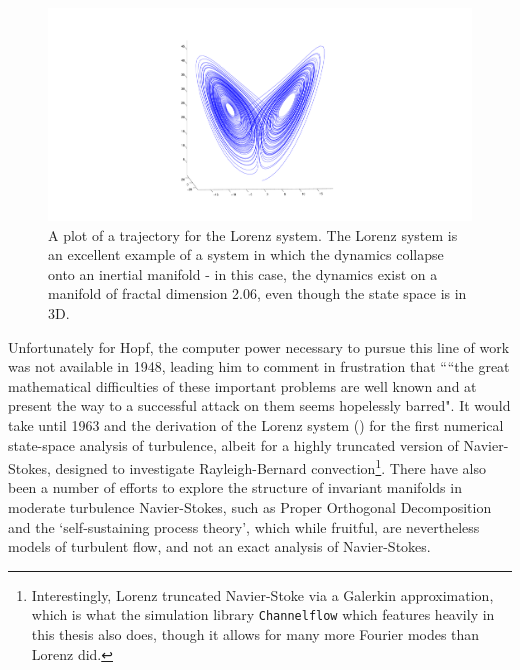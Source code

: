 \begin{figure}[h]
\centerline{
\includegraphics[scale=0.5	]{Figs/LorenzAttractor}}
\caption{A plot of a trajectory for the Lorenz system. The Lorenz system is an excellent example of a system in which the dynamics collapse onto an inertial manifold - in this case, the dynamics exist on a manifold of fractal dimension 2.06, even though the state space is in 3D. }\label{fig:LorenzAttractor}
\end{figure}

Unfortunately for Hopf, the computer power necessary to pursue this line of work was not available in 1948, leading him to comment in frustration that ``“the great mathematical difficulties of these important problems are well
known and at present the way to a successful attack on them seems hopelessly
barred". It would take until 1963 and the derivation of the Lorenz system () for the first numerical state-space analysis of turbulence, albeit for a highly truncated version of Navier-Stokes, designed to investigate Rayleigh-Bernard convection\footnote{Interestingly, Lorenz truncated Navier-Stoke via a Galerkin approximation, which is what the simulation library {\tt Channelflow} which features heavily in this thesis also does, though it allows for many more Fourier modes than Lorenz did.}. There have also been a number of efforts to explore the structure of invariant manifolds in moderate turbulence Navier-Stokes, such as Proper Orthogonal Decomposition and the `self-sustaining process theory', which while fruitful, are nevertheless models of turbulent flow, and not an exact analysis of Navier-Stokes.\\


